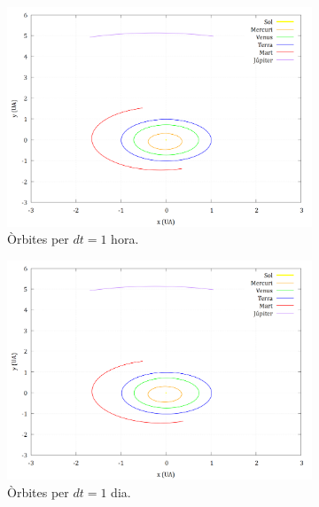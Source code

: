 \documentclass[10pt, twoside, a4paper]{article}
\begin{document}
\begin{figure}[h]
    \centering
    
    \begin{subfigure}[b]{0.32\linewidth}
        \centering
        \includegraphics[width=\linewidth]{../sist_solar/orbites_euler_1_d1hora.png}
        \caption{Òrbites per $dt=1$ hora.}
        \label{fig:euler_implicit_solucio}
    \end{subfigure}
    \hfill
    \begin{subfigure}[b]{0.32\linewidth}
        \centering
        \includegraphics[width=\linewidth]{../sist_solar/orbites_euler_1_d1dia.png}
        \caption{Òrbites per $dt=1$ dia.}
        \label{fig:euler_implicit_errors}
    \end{subfigure}
    \hfill
    \begin{subfigure}[b]{0.32\linewidth}

\end{subfigure}
\end{figure}
\end{document}
